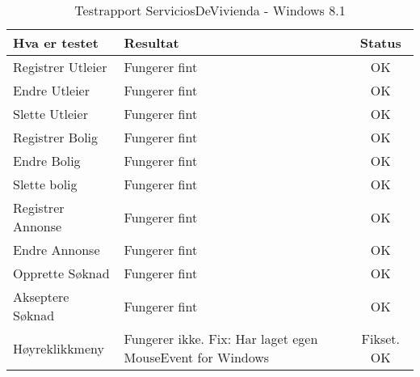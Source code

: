 
\begin{table}
\center
\caption[Testrapport - Windows 8.1]{Testrapport ServiciosDeVivienda - Windows 8.1}
\label{tab:test2}

\begin{tabular}{|l|p{7cm}|c|}
\hline

\textbf{\large Hva er testet}
&
\textbf{\large Resultat}
&
\textbf{\large Status}
\\ \hline
Registrer Utleier
&
Fungerer fint
&
OK
\\ \hline
Endre Utleier
&
Fungerer fint
&
OK
\\ \hline
Slette Utleier
&
Fungerer fint
&
OK
\\ \hline
Registrer Bolig
&
Fungerer fint
&
OK
\\ \hline
Endre Bolig
&
Fungerer fint
&
OK
\\ \hline
Slette bolig
&
Fungerer fint
&
OK
\\ \hline
Registrer Annonse
&
Fungerer fint
&
OK
\\ \hline
Endre Annonse
&
Fungerer fint
&
OK
\\ \hline
Opprette Søknad
&
Fungerer fint
&
OK
\\ \hline
Akseptere Søknad
&
Fungerer fint
&
OK
\\ \hline
Høyreklikkmeny
&
Fungerer ikke. 
Fix: Har laget egen MouseEvent for Windows
&
Fikset. 
OK
\\ \hline


\end{tabular}
\end{table}
